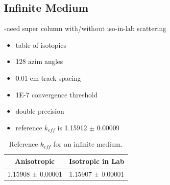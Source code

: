 \subsection{Infinite Medium}
\label{subsec:chap4-inf-medium}

-need super column with/without iso-in-lab scattering

\begin{itemize}[noitemsep]
\item table of isotopics
\item 128 azim angles
\item 0.01 cm track spacing
\item 1E-7 convergence threshold
\item double precision
\item reference $k_{eff}$ is 1.15912 $\pm$ 0.00009
\end{itemize}

\begin{table}[h!]
  \centering
  \caption{Reference $k_{eff}$ for an infinite medium.}
  \label{table:chap2-inf-med-reference} 
  \vspace{14pt}
  \begin{tabular}{c c}
  \toprule
  \multicolumn{1}{c}{\bf Anisotropic} &
  \multicolumn{1}{c}{\bf Isotropic in Lab} \\
  \midrule
  1.15908 $\pm$ 0.00001 & 1.15907 $\pm$ 0.00001 \\
  \bottomrule
\end{tabular}
\end{table}


